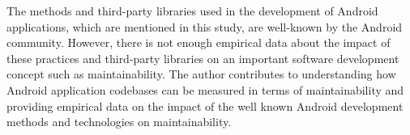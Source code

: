 The methods and third-party libraries used in the development of Android applications, which are mentioned in this study, are well-known by the Android community. However, there is not enough empirical data about the impact of these practices and third-party libraries on an important software development concept such as maintainability. The author contributes to understanding how Android application codebases can be measured in terms of maintainability and providing empirical data on the impact of the well known Android development methods and technologies on maintainability. 